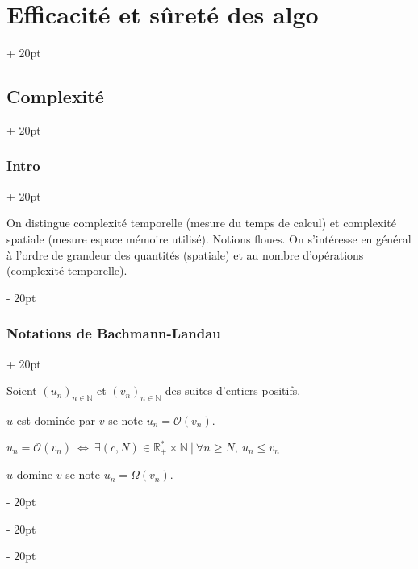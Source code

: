\documentclass[a4paper, 12pt, twoside]{article}
\newcommand{\N}{\mathbb{N}} %
\newcommand{\R}{\mathbb{R}} %
\newcommand{\ssi}{\ \Leftrightarrow \ }
\newcommand{\ind}[1][20pt]{\advance\leftskip + #1}
\newcommand{\deind}[1][20pt]{\advance\leftskip - #1}
\newenvironment{indentedenv}[1][20pt]{\par \ind[#1]}{\par \deind}
\newenvironment{indt}[2][20pt]{#2 \begin{indentedenv}[#1]}{\end{indentedenv}} %
\begin{document}
    \begin{indt}{\section{Efficacité et sûreté des algo}}
        
        \begin{indt}{\subsection{Complexité}}
            
            \begin{indt}{\subsubsection{Intro}}
                
                On distingue complexité temporelle (mesure du temps de calcul) et complexité spatiale (mesure espace mémoire utilisé). Notions floues. On s'intéresse en général à l'ordre de grandeur des quantités (spatiale) et au nombre d'opérations (complexité temporelle).
                
            \end{indt}
            
            \vspace{12pt}
            
            \begin{indt}{\subsubsection{Notations de Bachmann-Landau}}
                
                Soient $(u_n)_{n \in \N}$ et $(v_n)_{n \in \N}$ des suites d'entiers positifs.
                
                \vspace{6pt}
                
                $u$ est dominée par $v$ se note $u_n = \mathcal{O}(v_n)$.
                
                $u_n = \mathcal{O}(v_n) \ssi \exists (c, N) \in \R_+^* \times \N \ |\ \forall n \ge N,\ u_n \le v_n$
                
                \vspace{6pt}
                
                $u$ domine $v$ se note $u_n = \Omega(v_n)$.
                

\end{indt}
\end{indt}
\end{indt}
\end{document}
